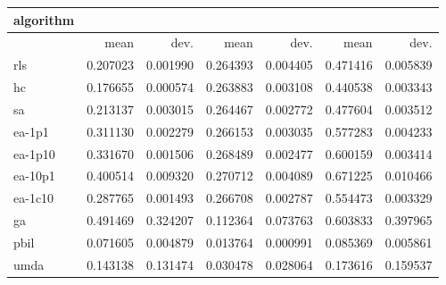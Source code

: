 \begin{tabular}{@{}l*{6}{>{{}}N{1}{2}}@{}}
\toprule
{algorithm} &  &  &  \\
\midrule
& {mean} & {dev.} & {mean} & {dev.} & {mean} & {dev.} \\
\midrule
rls & 0.207023 & 0.001990 & 0.264393 & 0.004405 & 0.471416 & 0.005839 \\
 hc & 0.176655 & 0.000574 & 0.263883 & 0.003108 & 0.440538 & 0.003343 \\
 sa & 0.213137 & 0.003015 & 0.264467 & 0.002772 & 0.477604 & 0.003512 \\
 ea-1p1 & 0.311130 & 0.002279 & 0.266153 & 0.003035 & 0.577283 & 0.004233 \\
 ea-1p10 & 0.331670 & 0.001506 & 0.268489 & 0.002477 & 0.600159 & 0.003414 \\
 ea-10p1 & 0.400514 & 0.009320 & 0.270712 & 0.004089 & 0.671225 & 0.010466 \\
 ea-1c10 & 0.287765 & 0.001493 & 0.266708 & 0.002787 & 0.554473 & 0.003329 \\
 ga & 0.491469 & 0.324207 & 0.112364 & 0.073763 & 0.603833 & 0.397965 \\
 pbil & 0.071605 & 0.004879 & 0.013764 & 0.000991 & 0.085369 & 0.005861 \\
 umda & 0.143138 & 0.131474 & 0.030478 & 0.028064 & 0.173616 & 0.159537 \\
 \bottomrule
\end{tabular}
